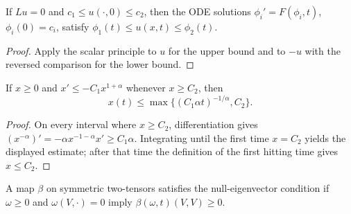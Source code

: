 \begin{theorem}
\label{thm:chow-ii-scalar-two-sided}
If $Lu=0$ and $c_1\le u(\cdot,0)\le c_2$, then the ODE solutions
\(\phi_i'=F(\phi_i,t)\), \(\phi_i(0)=c_i\), satisfy
\(\phi_1(t)\le u(x,t)\le\phi_2(t)\).
\end{theorem}
\begin{proof}
\sketch
Apply the scalar principle to $u$ for the upper bound and to $-u$ with the
reversed comparison for the lower bound.
\end{proof}

\begin{example}
\label{ex:chow-ii-ode-decay}
If $x\ge0$ and $x'\le-C_1x^{1+\alpha}$ whenever $x\ge C_2$, then
\[
x(t)\le\max\{(C_1\alpha t)^{-1/\alpha},C_2\}.
\]
\end{example}
\begin{proof}
\sketch
On every interval where $x\ge C_2$, differentiation gives
\((x^{-\alpha})'=-\alpha x^{-1-\alpha}x'\ge C_1\alpha\).  Integrating until
the first time $x=C_2$ yields the displayed estimate; after that time the
definition of the first hitting time gives $x\le C_2$.
\end{proof}

\begin{definition}
\label{def:chow-ii-null-eigenvector}
A map $\beta$ on symmetric two-tensors satisfies the null-eigenvector condition
if $\omega\ge0$ and $\omega(V,\cdot)=0$ imply $\beta(\omega,t)(V,V)\ge0$.
\end{definition}

